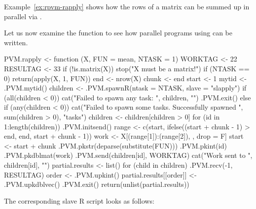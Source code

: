 Example~\ref{ex:rpvm-rapply} shows how the rows of a matrix 
can be summed up in parallel via .

Let us now examine the function to see how parallel programs using
 can be written.

\begin{Example}
\begin{Scode}
PVM.rapply <- function (X, FUN = mean, NTASK = 1)
{
    WORKTAG <- 22
    RESULTAG <- 33
    if (!is.matrix(X)) {
        stop("X must be a matrix!")
    }
    if (NTASK == 0) {
        return(apply(X, 1, FUN))
    }
    end <- nrow(X)
    chunk <- end%
    start <- 1
    mytid <- .PVM.mytid()
    children <- .PVM.spawnR(ntask = NTASK, slave = "slapply")
    if (all(children < 0)) {
        cat("Failed to spawn any task: ", children, "\n")
        .PVM.exit()
    }
    else if (any(children < 0)) {
        cat("Failed to spawn some tasks.  Successfully spawned ",
            sum(children > 0), "tasks\n")
        children <- children[children > 0]
    }
    for (id in 1:length(children)) {
        .PVM.initsend()
        range <- c(start, ifelse((start + chunk - 1) > end, end,
            start + chunk - 1))
        work <- X[(range[1]):(range[2]), , drop = F]
        start <- start + chunk
        .PVM.pkstr(deparse(substitute(FUN)))
        .PVM.pkint(id)
        .PVM.pkdblmat(work)
        .PVM.send(children[id], WORKTAG)
        cat("Work sent to ", children[id], "\n")
    }
    partial.results <- list()
    for (child in children) {
        .PVM.recv(-1, RESULTAG)
        order <- .PVM.upkint()
        partial.results[[order]] <- .PVM.upkdblvec()
    }
    .PVM.exit()
    return(unlist(partial.results))
}
\end{Scode} 
\label{ex:rpvm-rapplymaster}
\end{Example}

The corresponding slave R script looks as follows:

